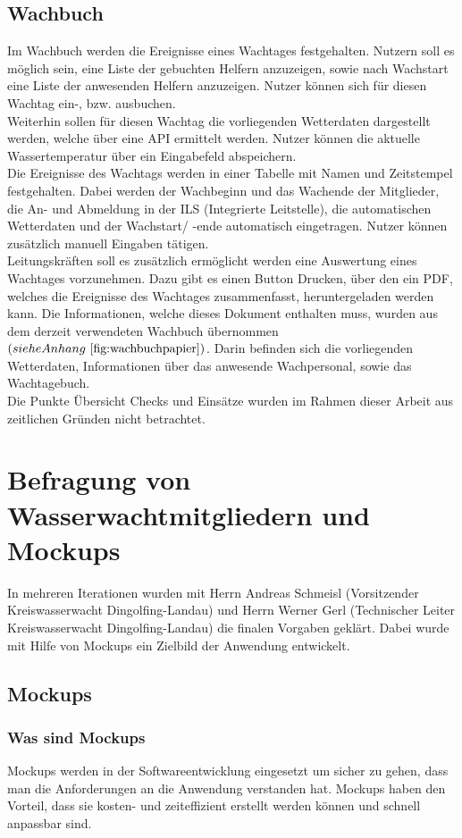\documentclass[fontsize=12pt,openright,oneside,paper=a4,BCOR=1cm]{scrbook}
\begin{document}
\subsection{Wachbuch}
Im Wachbuch werden die Ereignisse eines Wachtages festgehalten. Nutzern soll es möglich sein, eine Liste der gebuchten Helfern anzuzeigen, sowie nach Wachstart eine Liste der anwesenden Helfern anzuzeigen. Nutzer können sich für diesen Wachtag ein-, bzw. ausbuchen. \\
Weiterhin sollen für diesen Wachtag die vorliegenden Wetterdaten dargestellt werden, welche über eine API ermittelt werden. Nutzer können die aktuelle Wassertemperatur über ein Eingabefeld abspeichern. \\
Die Ereignisse des Wachtags werden in einer Tabelle mit Namen und Zeitstempel festgehalten. Dabei werden der Wachbeginn und das Wachende der Mitglieder, die An- und Abmeldung in der ILS (Integrierte Leitstelle), die automatischen Wetterdaten und der Wachstart/ -ende automatisch eingetragen. Nutzer können zusätzlich manuell Eingaben tätigen. \\
Leitungskräften soll es zusätzlich ermöglicht werden eine Auswertung eines Wachtages vorzunehmen. Dazu gibt es einen Button \glqq Drucken\grqq{}, über den ein PDF, welches die Ereignisse des Wachtages zusammenfasst, heruntergeladen werden kann. Die Informationen, welche dieses Dokument enthalten muss, wurden aus dem derzeit verwendeten Wachbuch übernommen $(siehe Anhang ~\ref{fig:wachbuchpapier})$. Darin befinden sich die vorliegenden Wetterdaten, Informationen über das anwesende Wachpersonal, sowie das Wachtagebuch. \\
Die Punkte \glqq Übersicht Checks\grqq{} und \glqq Einsätze\grqq{} wurden im Rahmen dieser Arbeit aus zeitlichen Gründen nicht betrachtet. 

\section{Befragung von Wasserwachtmitgliedern und Mockups}
In mehreren Iterationen wurden mit Herrn Andreas Schmeisl (Vorsitzender Kreiswasserwacht Dingolfing-Landau) und Herrn Werner Gerl (Technischer Leiter Kreiswasserwacht Dingolfing-Landau) die finalen Vorgaben geklärt. Dabei wurde mit Hilfe von Mockups ein Zielbild der Anwendung entwickelt. 
\subsection{Mockups}
\subsubsection{Was sind Mockups}
Mockups werden in der Softwareentwicklung eingesetzt um sicher zu gehen, dass man die Anforderungen an die Anwendung verstanden hat. Mockups haben den Vorteil, dass sie kosten- und zeiteffizient erstellt werden können und schnell anpassbar sind.
\end{document}
